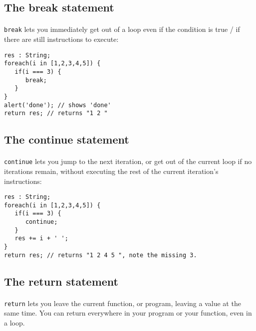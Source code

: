\documentclass{article}
\begin{document}
\begin{sloppypar}
      
   
   

\subsection{ The break statement}


\paragraph{}
\lstinline!break! lets you immediately get out of a loop even if the condition is true / if there are still instructions to execute:
      
{\begin{lstlisting}
res : String;
foreach(i in [1,2,3,4,5]) {
   if(i === 3) {
      break;
   }
}
alert('done'); // shows 'done'
return res; // returns "1 2 "
\end{lstlisting}
}

   
   
   

\subsection{ The continue statement}


\paragraph{}
\lstinline!continue! lets you jump to the next iteration, or get out of the current loop if no iterations remain, without executing the rest of the current iteration's instructions:

{\begin{lstlisting}
res : String;
foreach(i in [1,2,3,4,5]) {
   if(i === 3) {
      continue;
   }
   res += i + ' ';
}
return res; // returns "1 2 4 5 ", note the missing 3.
\end{lstlisting}
}

   
   
   

\subsection{ The return statement}


\paragraph{}
\lstinline!return! lets you leave the current function, or program, leaving a value at the same time. You can return everywhere in your program or your function, even in a loop.
      

\end{sloppypar}
\end{document}
